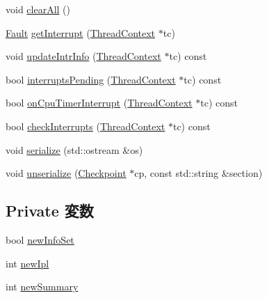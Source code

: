 \begin{DoxyCompactItemize}
\item 
void \hyperlink{classMipsISA_1_1Interrupts_a798729dca95209ecdc609807a653a2bf}{clearAll} ()
\item 
\hyperlink{classRefCountingPtr}{Fault} \hyperlink{classMipsISA_1_1Interrupts_ae603c88d759977611d3bcc6e2deb61ae}{getInterrupt} (\hyperlink{classThreadContext}{ThreadContext} $\ast$tc)
\item 
void \hyperlink{classMipsISA_1_1Interrupts_ad92c743dd73ba955adb1aaa2d9135fb7}{updateIntrInfo} (\hyperlink{classThreadContext}{ThreadContext} $\ast$tc) const 
\item 
bool \hyperlink{classMipsISA_1_1Interrupts_a79de56931b0c5eff3edb7585b2b14286}{interruptsPending} (\hyperlink{classThreadContext}{ThreadContext} $\ast$tc) const 
\item 
bool \hyperlink{classMipsISA_1_1Interrupts_a3dfe5717c5a726738b098c9b5c747a44}{onCpuTimerInterrupt} (\hyperlink{classThreadContext}{ThreadContext} $\ast$tc) const 
\item 
bool \hyperlink{classMipsISA_1_1Interrupts_af3c66fb49fec598cf78aaec29d764952}{checkInterrupts} (\hyperlink{classThreadContext}{ThreadContext} $\ast$tc) const 
\item 
void \hyperlink{classMipsISA_1_1Interrupts_a53e036786d17361be4c7320d39c99b84}{serialize} (std::ostream \&os)
\item 
void \hyperlink{classMipsISA_1_1Interrupts_af22e5d6d660b97db37003ac61ac4ee49}{unserialize} (\hyperlink{classCheckpoint}{Checkpoint} $\ast$cp, const std::string \&section)
\end{DoxyCompactItemize}
\subsection*{Private 変数}
\begin{DoxyCompactItemize}
\item 
bool \hyperlink{classMipsISA_1_1Interrupts_af2d03360eddc7a37308f528ec004d1aa}{newInfoSet}
\item 
int \hyperlink{classMipsISA_1_1Interrupts_a1de149de9a59d4b8291c2aa655119825}{newIpl}
\item 
int \hyperlink{classMipsISA_1_1Interrupts_ad13b7544dc5de8549f52b32df52e0d72}{newSummary}
\end{DoxyCompactItemize}



